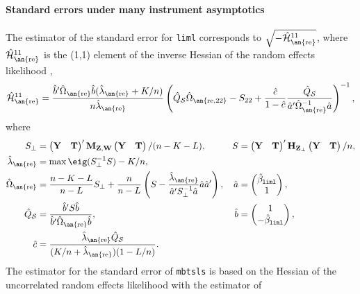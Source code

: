 \documentclass{mynotes}
\newcommand{\by}{\mathbf{Y}} %
\newcommand{\bt}{\mathbf{T}} %
\newcommand{\bz}{\mathbf{Z}} %
\newcommand{\bw}{\mathbf{W}} %
\newcommand{\Hm}[1]{\mathbf{H}_{#1}} %
\newcommand{\Mm}[1]{\mathbf{M}_{#1}} %
\newcommand{\hQs}{\hat{Q}_{\mathcal{S}}} %
\newcommand{\h}[2]{\hat{#1}_{\text{\an{#2}}}} %
\begin{document}
\paragraph{Standard errors under many instrument asymptotics}
The estimator of the standard error for \texttt{liml} corresponds to
$\sqrt{-\h{\mathcal{H}}{re}^{11}}$, where $\h{\mathcal{H}}{re}^{11}$ is the
(1,1) element of the inverse Hessian of the random effects likelihood
\citep{kolesar12re},
    \begin{equation*}
      \h{\mathcal{H}}{re}^{11}= \frac{\hat{b}'\h{\Omega}{re}\hat{b}
        (\h{\lambda}{re}+K/n)}{n\h{\lambda}{re}}\left(
        \hQs\h{\Omega}{re,22}-S_{22}+\frac{\hat c}{1-\hat c}\frac{\hQs}{\hat{a}'
\h{\Omega}{re}^{-1}\hat{a}} \right)^{-1},
    \end{equation*}
where
    \begin{align*}
      S_{\perp}&=      \begin{pmatrix}
        \by&\bt
      \end{pmatrix}'
\Mm{\bz,\bw}
      \begin{pmatrix}
        \by&\bt
      \end{pmatrix}
/(n-K-L),&S&= \begin{pmatrix}
        \by&\bt
      \end{pmatrix}'
\Hm{\bz_{\perp}}
      \begin{pmatrix}
        \by&\bt
      \end{pmatrix}/n,\\
      \h{\lambda}{re}&=\max\eig(S^{-1}_{\perp}S)-K /n,\\
      \h{\Omega}{re}&=\frac{n-K-L}{n-L}S_{\perp}+\frac{n}{n-L}\left(S-
        \frac{\h{\lambda}{re}}{\hat{a}'S_{\perp}^{-1}\hat{a} } \hat{a}\hat{a}'\right),&
      \hat{a}&=
      \begin{pmatrix}
        \hat{\beta}_{\mathtt{liml}}\\1
      \end{pmatrix},
      \\
      \hQs &=\frac{\hat{b}'S \hat{b}}{\hat{b}'\h{\Omega}{re} \hat{b}},& \hat{b}
      &=
  \begin{pmatrix}
    1\\-\hat{\beta}_{\mathtt{liml}}
  \end{pmatrix},\\
\hat c&=\frac{\h{\lambda}{re} \hQs}{(K/n+\h{\lambda}{re})(1-L/n)}.
    \end{align*}
    The estimator for the standard error of \texttt{mbtsls} is based on the
    Hessian of the uncorrelated random effects likelihood with the estimator of
\end{document}
